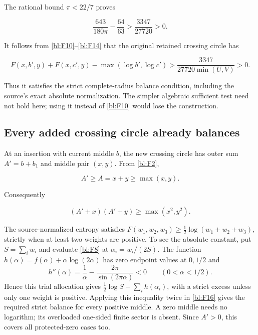 The rational bound \(\pi<22/7\) proves

\begin{equation}\label{bl:F14}
\frac{643}{180\pi}-\frac{64}{63}
>\frac{3347}{27720}>0.
\end{equation}

It follows from \eqref{bl:F10}--\eqref{bl:F14} that the original retained crossing circle has

\begin{equation}\label{bl:F15}
F(x,b',y)+F(x,c',y)-\max(\log b',\log c')
>\frac{3347}{27720\min(U,V)}>0.
\end{equation}

Thus it satisfies the strict complete-radius balance condition, including
the source's exact absolute normalization. The simpler algebraic
sufficient test need not hold here; using it instead of \eqref{bl:F10} would lose
the construction.

\subsection{Every added crossing circle already balances}\label{bl:every-added-crossing-circle-already-balances}

At an insertion with current middle \(b\), the new crossing circle has outer sum
\(A'=b+b_1\) and middle pair \((x,y)\). From \eqref{bl:F2},

\[
A'\ge A=x+y\ge\max(x,y).
\]

Consequently

\begin{equation}\label{bl:F16}
(A'+x)(A'+y)\ge\max(x^2,y^2).
\end{equation}

The source-normalized entropy satisfies
\(F(w_1,w_2,w_3)\ge\tfrac12\log(w_1+w_2+w_3)\), strictly when at
least two weights are positive. To see the absolute constant, put
\(S=\sum_iw_i\) and evaluate \eqref{bl:F8} at
\(\alpha_i=w_i/(2S)\). The function
\(h(\alpha)=f(\alpha)+\alpha\log(2\alpha)\) has zero endpoint values
at \(0,1/2\) and
\[
 h''(\alpha)=\frac1\alpha-\frac{2\pi}{\sin(2\pi\alpha)}<0
                 \qquad(0<\alpha<1/2).
\]
Hence this trial allocation gives
\(\tfrac12\log S+\sum_i h(\alpha_i)\), with a strict excess unless
only one weight is positive. Applying this inequality twice in
\eqref{bl:F16} gives the required strict balance for every positive
middle. A zero middle needs no logarithm; its overloaded
one-sided finite sector is absent. Since \(A'>0\), this covers all
protected-zero cases too.

